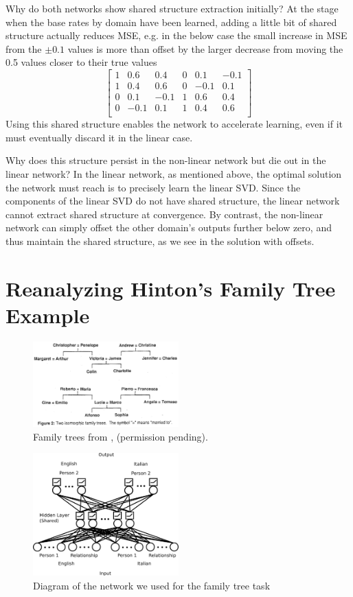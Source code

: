 \documentclass[10pt,letterpaper]{article}
\begin{document}
Why do both networks show shared structure extraction initially? At the stage when the base rates by domain have been learned, adding a little bit of shared structure actually reduces MSE, e.g. in the below case the small increase in MSE from the \(\pm 0.1\) values is more than offset by the larger decrease from moving the 0.5 values closer to their true values 
\[ 
\left[ \begin{matrix} 
1 & 0.6 & 0.4 & 0 & 0.1 & -0.1 \\
1 & 0.4 & 0.6 & 0 & -0.1 & 0.1 \\
0 & 0.1 & -0.1 & 1 & 0.6 & 0.4  \\
0 & -0.1 & 0.1 & 1 & 0.4 & 0.6  \\
\end{matrix}  \right] 
\] 
Using this shared structure enables the network to accelerate learning, even if it must eventually discard it in the linear case.  \par
Why does this structure persist in the non-linear network but die out in the linear network? In the linear network, as mentioned above, the optimal solution the network must reach is to precisely learn the linear SVD. Since the components of the linear SVD do not have shared structure, the linear network cannot extract shared structure at convergence. By contrast, the non-linear network can simply offset the other domain's outputs further below zero, and thus maintain the shared structure, as we see in the solution with offsets. 
\section{Reanalyzing Hinton's Family Tree Example}
\begin{figure}
\includegraphics[width=0.5\textwidth]{figures/hinton_family_tree_figure.png}
\caption{Family trees from \citet{Hinton1986}, (permission pending).}
\label{hinton_family_tree_figure}
\end{figure}

\begin{figure}
\centering
\includegraphics[width=0.5\textwidth]{figures/family_tree_network_diagram.png}
\caption{Diagram of the network we used for the family tree task}
\label{family_tree_network_diagram}
\end{figure}
\end{document}
